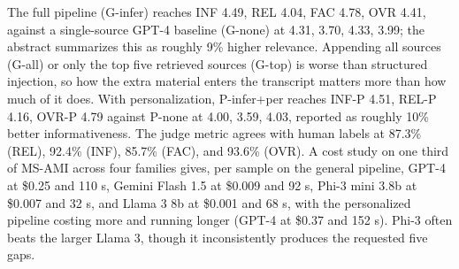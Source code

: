 The full pipeline (G-infer) reaches INF 4.49, REL 4.04, FAC 4.78, OVR 4.41, against a single-source GPT-4 baseline (G-none) at 4.31, 3.70, 4.33, 3.99; the abstract summarizes this as roughly 9\% higher relevance. Appending all sources (G-all) or only the top five retrieved sources (G-top) is worse than structured injection, so how the extra material enters the transcript matters more than how much of it does. With personalization, P-infer+per reaches INF-P 4.51, REL-P 4.16, OVR-P 4.79 against P-none at 4.00, 3.59, 4.03, reported as roughly 10\% better informativeness. The judge metric agrees with human labels at 87.3\% (REL), 92.4\% (INF), 85.7\% (FAC), and 93.6\% (OVR). A cost study on one third of MS-AMI across four families gives, per sample on the general pipeline, GPT-4 at \$0.25 and 110 s, Gemini Flash 1.5 at \$0.009 and 92 s, Phi-3 mini 3.8b at \$0.007 and 32 s, and Llama 3 8b at \$0.001 and 68 s, with the personalized pipeline costing more and running longer (GPT-4 at \$0.37 and 152 s). Phi-3 often beats the larger Llama 3, though it inconsistently produces the requested five gaps.

